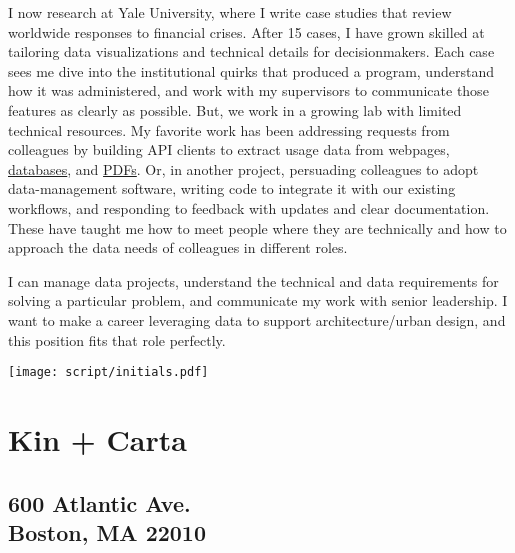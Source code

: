 \documentclass{stationery-letter}
\begin{document}
\begin{minipage}[t]{0.70\textwidth}
\begin{onehalfspace}
        I now research at Yale University, where I write case studies that review worldwide responses to financial crises.
        After 15 cases, I have grown skilled at tailoring data visualizations and technical details for decisionmakers.
        Each case sees me dive into the institutional quirks that produced a program, understand how it was administered, and work with my supervisors to communicate those features as clearly as possible.
        But, we work in a growing lab with limited technical resources.
        My favorite work has been addressing requests from colleagues by building API clients to extract usage data from webpages, \href{https://github.com/runkelcorey/valet}{databases}, and \href{https://github.com/runkelcorey/ela}{PDFs}.
        Or, in another project, persuading colleagues to adopt data-management software, writing code to integrate it with our existing workflows, and responding to feedback with updates and clear documentation.
        These have taught me how to meet people where they are technically and how to approach the data needs of colleagues in different roles.

        I can manage data projects, understand the technical and data requirements for solving a particular problem, and communicate my work with senior leadership.
        I want to make a career leveraging data to support architecture/urban design, and this position fits that role perfectly.

        \sectionsep

        \texttt{[image: script/initials.pdf]}

    \end{onehalfspace}



%
%

\end{minipage} 
\hfill {\color{primary}\vline} \hfill
\begin{minipage}[t]{0.25\textwidth} 


\sectionsep
\sectionsep
\section{Kin + Carta}
\subsection{600 Atlantic Ave. \\ Boston, MA 22010}


\end{minipage} 
\end{document}
